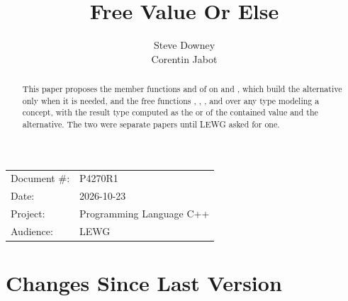 \documentclass[a4paper,10pt,oneside,openany,final,article]{memoir}
\begin{document}
\title{Free Value Or Else}
\author{%
  Steve Downey\\%
  Corentin Jabot%
}
\date{} %
\maketitle

\begin{flushright}
  \begin{tabular}{ll}
    Document \#: & P4270R1 \\
    Date: & 2026-10-23 \\
    Project: & Programming Language C++ \\
    Audience: & LEWG
  \end{tabular}
\end{flushright}

\begin{abstract}
  This paper proposes the member functions  and
   of \cite{P3413R0} on  and
  , which build the alternative only when it is
  needed, and the free functions , ,
  , and  over any type modeling a
   concept, with the result type computed as the
   or  of the contained value
  and the alternative. The two were separate papers until LEWG asked for
  one.
\end{abstract}

\tableofcontents*

\chapter*{Changes Since Last Version}
\end{document}
